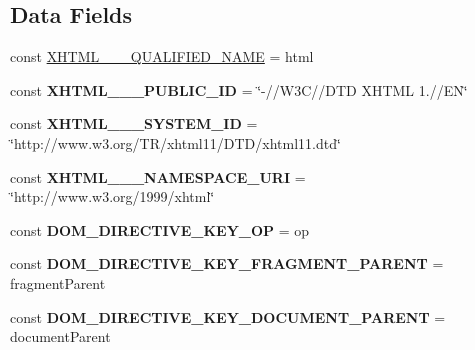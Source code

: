 \subsection*{Data Fields}
\begin{DoxyCompactItemize}
\item 
const \hyperlink{class_able_polecat___dom_a9687e5f2a0ad8e40fbf6de213dc8e077}{X\+H\+T\+M\+L\+\_\+\_\+\_\+\+Q\+U\+A\+L\+I\+F\+I\+E\+D\+\_\+\+N\+A\+M\+E} = \textquotesingle{}html\textquotesingle{}
\item 
\hypertarget{class_able_polecat___dom_a822eadbfb5834ce94a2f8436ab55310f}{}const {\bfseries X\+H\+T\+M\+L\+\_\+\_\+\_\+\+P\+U\+B\+L\+I\+C\+\_\+\+I\+D} = \char`\"{}-\///W3\+C//D\+T\+D X\+H\+T\+M\+L 1.//E\+N\char`\"{}\label{class_able_polecat___dom_a822eadbfb5834ce94a2f8436ab55310f}

\item 
\hypertarget{class_able_polecat___dom_a69f7dacf77a9f45aa3c38459f6d9501c}{}const {\bfseries X\+H\+T\+M\+L\+\_\+\_\+\_\+\+S\+Y\+S\+T\+E\+M\+\_\+\+I\+D} = \char`\"{}http\+://www.\+w3.\+org/T\+R/xhtml11/D\+T\+D/xhtml11.\+dtd\char`\"{}\label{class_able_polecat___dom_a69f7dacf77a9f45aa3c38459f6d9501c}

\item 
\hypertarget{class_able_polecat___dom_afa3afe45c2bde34ef69ac1c8999c4d11}{}const {\bfseries X\+H\+T\+M\+L\+\_\+\_\+\_\+\+N\+A\+M\+E\+S\+P\+A\+C\+E\+\_\+\+U\+R\+I} = \char`\"{}http\+://www.\+w3.\+org/1999/xhtml\char`\"{}\label{class_able_polecat___dom_afa3afe45c2bde34ef69ac1c8999c4d11}

\item 
\hypertarget{class_able_polecat___dom_a9cba04dab4044335f158efc287fedd17}{}const {\bfseries D\+O\+M\+\_\+\+D\+I\+R\+E\+C\+T\+I\+V\+E\+\_\+\+K\+E\+Y\+\_\+\+O\+P} = \textquotesingle{}op\textquotesingle{}\label{class_able_polecat___dom_a9cba04dab4044335f158efc287fedd17}

\item 
\hypertarget{class_able_polecat___dom_ab7955163886db31c89bdcec7ded1dec5}{}const {\bfseries D\+O\+M\+\_\+\+D\+I\+R\+E\+C\+T\+I\+V\+E\+\_\+\+K\+E\+Y\+\_\+\+F\+R\+A\+G\+M\+E\+N\+T\+\_\+\+P\+A\+R\+E\+N\+T} = \textquotesingle{}fragment\+Parent\textquotesingle{}\label{class_able_polecat___dom_ab7955163886db31c89bdcec7ded1dec5}

\item 
\hypertarget{class_able_polecat___dom_af2c554d9428e443d2a85536811e9e9fa}{}const {\bfseries D\+O\+M\+\_\+\+D\+I\+R\+E\+C\+T\+I\+V\+E\+\_\+\+K\+E\+Y\+\_\+\+D\+O\+C\+U\+M\+E\+N\+T\+\_\+\+P\+A\+R\+E\+N\+T} = \textquotesingle{}document\+Parent\textquotesingle{}\label{class_able_polecat___dom_af2c554d9428e443d2a85536811e9e9fa}


\end{DoxyCompactItemize}
